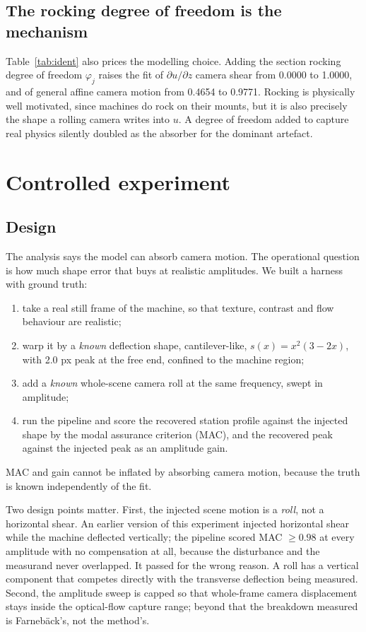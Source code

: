 \documentclass[preprint,12pt]{elsarticle}
\begin{document}
\subsection{The rocking degree of freedom is the mechanism}
\label{sec:rocking}

Table~\ref{tab:ident} also prices the modelling choice. Adding the section
rocking degree of freedom $\varphi_j$ raises the fit of
$\partial u/\partial z$ camera shear from 0.0000 to 1.0000, and of general
affine camera motion from 0.4654 to 0.9771. Rocking is physically well
motivated, since machines do rock on their mounts, but it is also precisely
the shape a rolling camera writes into $u$. A degree of freedom added to
capture real physics silently doubled as the absorber for the dominant
artefact.

\section{Controlled experiment}
\label{sec:controlled}

\subsection{Design}

The analysis says the model can absorb camera motion. The operational
question is how much shape error that buys at realistic amplitudes. We built
a harness with ground truth:
\begin{enumerate}
\item take a real still frame of the machine, so that texture, contrast and
  flow behaviour are realistic;
\item warp it by a \emph{known} deflection shape, cantilever-like,
  $s(x) = x^2(3 - 2x)$, with 2.0 px peak at the free end, confined to the
  machine region;
\item add a \emph{known} whole-scene camera roll at the same frequency,
  swept in amplitude;
\item run the pipeline and score the recovered station profile against the
  injected shape by the modal assurance criterion (MAC), and the recovered
  peak against the injected peak as an amplitude gain.
\end{enumerate}
MAC and gain cannot be inflated by absorbing camera motion, because the
truth is known independently of the fit.

Two design points matter. First, the injected scene motion is a \emph{roll},
not a horizontal shear. An earlier version of this experiment injected
horizontal shear while the machine deflected vertically; the pipeline scored
MAC $\ge 0.98$ at every amplitude with no compensation at all, because the
disturbance and the measurand never overlapped. It passed for the wrong
reason. A roll has a vertical component that competes directly with the
transverse deflection being measured. Second, the amplitude sweep is capped
so that whole-frame camera displacement stays inside the optical-flow
capture range; beyond that the breakdown measured is Farneb\"ack's, not the
method's.
\end{document}
